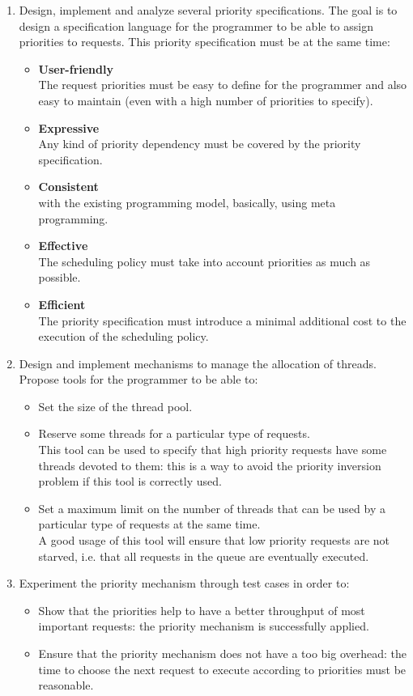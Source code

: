 \documentclass[11pt]{report}
\begin{document}
\begin{enumerate}
\item Design, implement and analyze several priority specifications. The goal is to design a specification language for the programmer to be able to assign priorities to requests. This priority specification must be at the same time:
	\begin{itemize}
	\item \textbf{User-friendly} \\The request priorities must be easy to define for the programmer and also easy to maintain (even with a high number of priorities to specify).
	\item \textbf{Expressive} \\Any kind of priority dependency must be covered by the priority specification.
	\item \textbf{Consistent} \\with the existing programming model, basically, using meta programming.
	\item \textbf{Effective} \\The scheduling policy must take into account priorities as much as possible.
	\item \textbf{Efficient} \\The priority specification must introduce a minimal additional cost to the execution of the scheduling policy.
	\end{itemize}
\item Design and implement mechanisms to manage the allocation of threads. Propose tools for the programmer to be able to:
	\begin{itemize}
	\item Set the size of the thread pool.
	\item Reserve some threads for a particular type of requests. \\This tool can be used to specify that high priority requests have some threads devoted to them: this is a way to avoid the priority inversion problem if this tool is correctly used.
	\item Set a maximum limit on the number of threads that can be used by a particular type of requests at the same time. \\A good usage of this tool will ensure that low priority requests are not starved, i.e. that all requests in the queue are eventually executed.
	\end{itemize}
\item Experiment the priority mechanism through test cases in order to:
	\begin{itemize}
	\item Show that the priorities help to have a better throughput of most important requests: the priority mechanism is successfully applied.
	\item Ensure that the priority mechanism does not have a too big overhead: the time to choose the next request to execute according to priorities must be reasonable.
	\end{itemize}
\end{enumerate}
\end{document}
